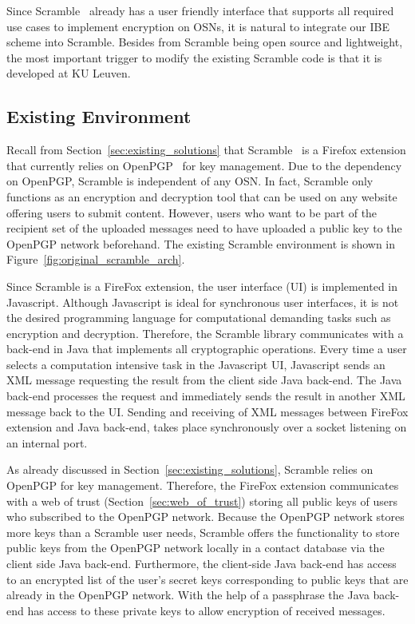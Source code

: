 Since Scramble~\cite{art:BeatoKW11} already has a user friendly interface that supports all required use cases to implement encryption on OSNs, it is natural to integrate our IBE scheme into Scramble. Besides from Scramble being open source and lightweight, the most important trigger to modify the existing Scramble code is that it is developed at KU Leuven.

\subsection{Existing Environment}
Recall from Section~\ref{sec:existing_solutions} that Scramble~\cite{art:BeatoKW11} is a Firefox extension that currently relies on OpenPGP~\cite{rfc4880} for key management. Due to the dependency on OpenPGP, Scramble is independent of any OSN. In fact, Scramble only functions as an encryption and decryption tool that can be used on any website offering users to submit content. However, users who want to be part of the recipient set of the uploaded messages need to have uploaded a public key to the OpenPGP network beforehand. The existing Scramble environment is shown in Figure~\ref{fig:original_scramble_arch}.

Since Scramble is a FireFox extension, the user interface (UI) is implemented in Javascript. Although Javascript is ideal for synchronous user interfaces, it is not the desired programming language for computational demanding tasks such as encryption and decryption. Therefore, the Scramble library communicates with a back-end in Java that implements all cryptographic operations. Every time a user selects a computation intensive task in the Javascript UI, Javascript sends an XML message requesting the result from the client side Java back-end. The Java back-end processes the request and immediately sends the result in another XML message back to the UI. Sending and receiving of XML messages between FireFox extension and Java back-end, takes place synchronously over a socket listening on an internal port.

As already discussed in Section~\ref{sec:existing_solutions}, Scramble relies on OpenPGP for key management. Therefore, the FireFox extension communicates with a web of trust (Section~\ref{sec:web_of_trust}) storing all public keys of users who subscribed to the OpenPGP network. Because the OpenPGP network stores more keys than a Scramble user needs, Scramble offers the functionality to store public keys from the OpenPGP network locally in a contact database via the client side Java back-end. Furthermore, the client-side Java back-end has access to an encrypted list of the user's secret keys corresponding to public keys that are already in the OpenPGP network. With the help of a passphrase the Java back-end has access to these private keys to allow encryption of received messages.


